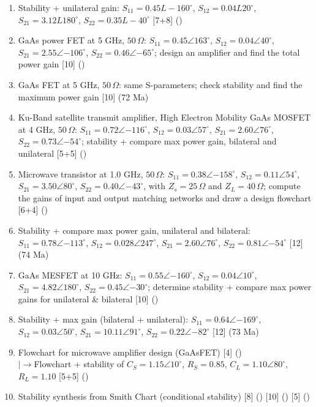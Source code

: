 \documentclass[12pt]{article}
\newcommand{\lb}{\\$\left|\rightarrow\right.$}
\begin{document}
\begin{enumerate}[topsep=0pt, noitemsep]
      \item Stability + unilateral gain: $S_{11}{=}0.45L{-}160^\circ$, $S_{12}{=}0.04L20^\circ$, $S_{21}{=}3.12L180^\circ$, $S_{22}{=}0.35L{-}40^\circ$ \hfill [7+8] ()
      \item GaAs power FET at 5 GHz, $50\,\Omega$: $S_{11}{=}0.45\angle163^\circ$, $S_{12}{=}0.04\angle40^\circ$, $S_{21}{=}2.55\angle{-106^\circ}$, $S_{22}{=}0.46\angle{-65^\circ}$; design an amplifier and find the total power gain \hfill [10] ()
      \item GaAs FET at 5 GHz, $50\,\Omega$: same S-parameters; check stability and find the maximum power gain \hfill [10] (72 Ma)
      \item Ku-Band satellite transmit amplifier, High Electron Mobility GaAs MOSFET at 4 GHz, $50\,\Omega$: $S_{11}{=}0.72\angle{-116^\circ}$, $S_{12}{=}0.03\angle57^\circ$, $S_{21}{=}2.60\angle76^\circ$, $S_{22}{=}0.73\angle{-54^\circ}$; stability + compare max power gain, bilateral and unilateral \hfill [5+5] ()
      \item Microwave transistor at 1.0 GHz, $50\,\Omega$: $S_{11}{=}0.38\angle{-158^\circ}$, $S_{12}{=}0.11\angle54^\circ$, $S_{21}{=}3.50\angle80^\circ$, $S_{22}{=}0.40\angle{-43^\circ}$, with $Z_s = 25\,\Omega$ and $Z_L = 40\,\Omega$; compute the gains of input and output matching networks and draw a design flowchart \hfill [6+4] ()
      \item Stability + compare max power gain, unilateral and bilateral: $S_{11}{=}0.78\angle{-113^\circ}$, $S_{12}{=}0.028\angle247^\circ$, $S_{21}{=}2.60\angle76^\circ$, $S_{22}{=}0.81\angle{-54^\circ}$ \hfill [12] (74 Ma)
      \item GaAs MESFET at 10 GHz: $S_{11}{=}0.55\angle{-160^\circ}$, $S_{12}{=}0.04\angle10^\circ$, $S_{21}{=}4.82\angle180^\circ$, $S_{22}{=}0.45\angle{-30^\circ}$; determine stability + compare max power gains for unilateral \& bilateral \hfill [10] ()
      \item Stability + max gain (bilateral + unilateral): $S_{11}{=}0.64\angle{-169^\circ}$, $S_{12}{=}0.03\angle50^\circ$, $S_{21}{=}10.11\angle91^\circ$, $S_{22}{=}0.22\angle{-82^\circ}$ \hfill [12] (73 Ma)
      \item Flowchart for microwave amplifier design (GaAsFET) \hfill [4] ()
        \lb Flowchart + stability of $C_S{=}1.15\angle10^\circ$, $R_S{=}0.85$, $C_L{=}1.10\angle80^\circ$, $R_L{=}1.10$ \hfill [5+5] ()
      \item Stability synthesis from Smith Chart (conditional stability) \hfill [8] () [10] () [5] ()

\end{enumerate}
\end{document}
